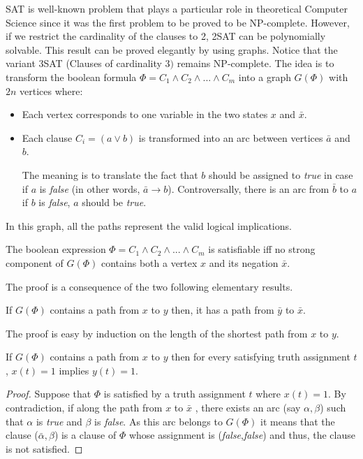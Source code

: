 SAT is well-known problem that plays a particular role in theoretical
Computer Science since it was the first problem to be proved to be
NP-complete.  However, if we restrict the cardinality of the clauses
to 2, 2SAT can be polynomially solvable.  This result can be proved
elegantly by using graphs. Notice that the variant 3SAT (Clauses of
cardinality $3)$ remains NP-complete.  The idea is to transform the
boolean formula $\Phi = C_1 \wedge C_2 \wedge ... \wedge C_m$ into a
graph $G(\Phi)$ with $2n$ vertices where:

\begin{itemize}
\item
Each vertex corresponds to one variable in the two states $x$ and
$\bar{x}$.
\item
Each clause $C_i = (a \vee b)$ is transformed into an arc between
vertices $\bar{a}$ and $b$.

The meaning is to translate the fact that $b$ should be assigned to
{\em true} in case if $a$ is {\em false} (in other words, $\bar{a}
\rightarrow b$).  Controversally, there is an arc from $\bar{b}$ to
$a$ if $b$ is {\em false}, $a$ should be {\em true}.
\end{itemize}

In this graph, all the paths represent the valid logical implications. 

\begin{prop}
\label{prop:2SAT}
The boolean expression $\Phi = C_1 \wedge C_2 \wedge ... \wedge C_m$
is satisfiable iff no strong component of $G(\Phi)$ contains both a
vertex $x$ and its negation $\bar{x}$.
\end{prop}

The proof is a consequence of the two following elementary results.

\begin{prop}
\label{prop:2SATlemma1}
If $G(\Phi)$ contains a path from $x$ to $y$ then, it has a path from
$\bar{y}$ to $\bar{x}$.
\end{prop}

The proof is easy by induction on the length of the shortest path from $x$ to $y$. 


\begin{prop}
\label{prop:2SATlemma2}
If $G(\Phi)$ contains a path from $x$ to $y$ then for every satisfying
truth assignment $t$, $x(t)=1$ implies $y(t)=1$.
\end{prop}

\begin{proof}
Suppose that $\Phi$ is satisfied by a truth assignment $t$ where
$x(t)=1$.  By contradiction, if along the path from $x$ to $\bar{x}$ ,
there exists an arc (say $\alpha,\beta$) such that $\alpha$ is {\em
  true} and $\beta$ is {\em false}.  As this arc belongs to $G(\Phi)$
it means that the clause ($\bar{\alpha},\beta$) is a clause of $\Phi$
whose assignment is ({\em false},{\em false}) and thus, the clause is
not satisfied.
\end{proof}
\medskip

